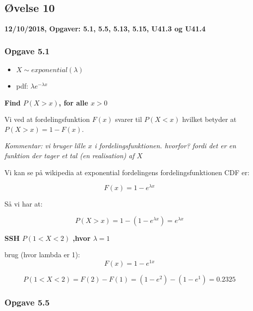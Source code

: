 \horizline

\subsection{Øvelse 10}

\textbf{12/10/2018, Opgaver: 5.1, 5.5, 5.13, 5.15,  U41.3 og U41.4}

\subsubsection{Opgave 5.1}

\begin{itemize}
    \item $X \sim exponential(\lambda)$
    \item pdf: $\lambda e^{-\lambda x}$
\end{itemize}

\textbf{Find $P(X>x)$, for alle $x>0$}

Vi ved at fordelingsfunktion $F(x)$ svarer til $P(X<x)$ hvilket betyder at $P(X>x) = 1 - F(x)$.

\textit{Kommentar: vi bruger lille $x$ i fordelingsfunktionen. hvorfor? fordi det er en funktion der tager et tal (en realisation) af $X$}

Vi kan se på wikipedia at exponential fordelingens fordelingsfunktionen CDF er:

\begin{equation}
    F(x) =  1 - e^{\lambda x}
\end{equation}

Så vi har at:

\begin{equation}
    P(X>x) = 1 - (1 - e^{\lambda x}) = e^{\lambda x}
\end{equation}

\textbf{SSH $P(1 < X < 2)$ ,hvor $\lambda = 1$}

brug (hvor lambda er 1):
\begin{equation}
    F(x) =  1 - e^{1 x}
\end{equation}

\begin{equation}
    P(1 < X < 2) = F(2) - F(1) = (1 - e^2) - ( 1- e^1) = 0.2325
\end{equation}

\subsubsection{Opgave 5.5}


